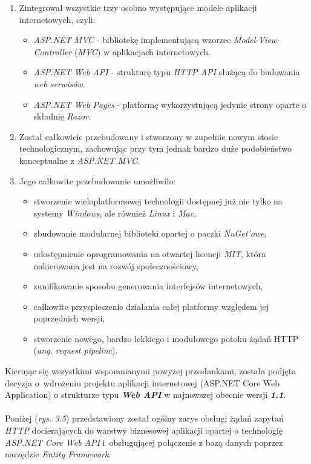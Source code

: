     \begin{enumerate}
        \item Zintegrował wszystkie trzy osobno występujące modele aplikacji internetowych, czyli:
    \begin{itemize}
        \item \textit{ASP.NET MVC} - bibliotekę implementującą wzorzec \textit{Model-View-Controller} (\textit{MVC}) w aplikacjach internetowych.
        \item \textit{ASP.NET Web API} - strukturę typu \textit{HTTP API} służącą do budowania \textit{web serwisów}.
        \item \textit{ASP.NET Web Pages} - platformę wykorzystującą jedynie strony oparte o  składnię \textit{Razor}.
    \end{itemize}
   \item Został całkowicie przebudowany i stworzony w zupełnie nowym stosie technologicznym, zachowując przy tym jednak bardzo duże podobieństwo konceptualne z \textit{ASP.NET MVC}.
    \item Jego całkowite przebudowanie umożliwiło:
        \begin{itemize}
            \item stworzenie wieloplatformowej technologii dostępnej już nie tylko na systemy \textit{Windows}, ale również \textit{Linux} i \textit{Mac},
            \item zbudowanie modularnej biblioteki opartej o paczki \textit{NuGet'owe},
            \item udostępnienie oprogramowania na otwartej licencji \textit{MIT}, która nakierowana jest na rozwój społecznościowy,
            \item zunifikowanie sposobu generowania interfejsów internetowych,
            \item całkowite przyspieszenie działania całej platformy względem jej poprzednich wersji,
            \item stworzenie nowego, bardzo lekkiego i modułowego potoku żądań HTTP (\textit{ang. request pipeline}).
        \end{itemize}
    \end{enumerate}
    Kierując się wszystkimi wspomnianymi powyżej przesłankami, została podjęta decyzja o~wdrożeniu projektu aplikacji internetowej (ASP.NET Core Web Application) o strukturze typu \textbf{\textit{Web API}} w najnowszej obecnie wersji \textbf{\textit{1.1}}.\\
    \\
    Poniżej (\textit{rys. 3.5}) przedstawiony został ogólny zarys
    obsługi żądań zapytań \textit{HTTP} docierających do warstwy biznesowej aplikacji opartej o technologię \textit{ASP.NET Core Web API} i~obsługującej połączenie z bazą danych poprzez narzędzie \textit{Entity Framework}.

